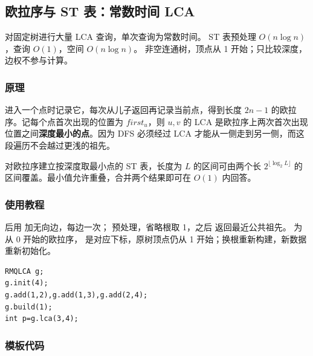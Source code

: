 \subsection{欧拉序与 ST 表：常数时间 LCA}
\label{tree:rmq-lca}
\AlgorithmInfo
    {对固定树进行大量 LCA 查询，单次查询为常数时间。}
    {ST 表预处理 $O(n\log n)$，查询 $O(1)$，空间 $O(n\log n)$。}
    {非空连通树，顶点从 1 开始；只比较深度，边权不参与计算。}
\subsubsection*{原理}
进入一个点时记录它，每次从儿子返回再记录当前点，得到长度 $2n-1$ 的欧拉序。记每个点首次出现的位置为 $first_u$，则 $u,v$ 的 LCA 是欧拉序上两次首次出现位置之间\textbf{深度最小的点}。因为 DFS 必须经过 LCA 才能从一侧走到另一侧，而这段遍历不会越过更浅的祖先。

对欧拉序建立按深度取最小点的 ST 表，长度为 $L$ 的区间可由两个长 $2^{\lfloor\log_2 L\rfloor}$ 的区间覆盖。最小值允许重叠，合并两个结果即可在 $O(1)$ 内回答。
\subsubsection*{使用教程}
 后用  加无向边，每边一次； 预处理，省略根取 1，之后  返回最近公共祖先。 为从 0 开始的欧拉序， 是对应下标，原树顶点仍从 1 开始；换根重新构建，新数据重新初始化。
\begin{lstlisting}[style=mtycpp,numbers=none]
RMQLCA g;
g.init(4);
g.add(1,2),g.add(1,3),g.add(2,4);
g.build(1);
int p=g.lca(3,4);
\end{lstlisting}
\subsubsection*{模板代码}
